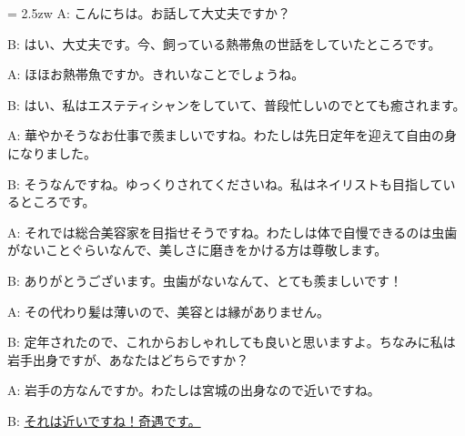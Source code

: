 \documentclass[11pt]{amsart}
\title{}
\author{}
\newenvironment{hangall}[1]{\hangindent = 2.5zw\everypar{\hangindent = 2.5zw}}{}
\begin{document}
\maketitle
\begin{hangall}{}%
A: こんにちは。お話して大丈夫ですか？

B: はい、大丈夫です。今、飼っている熱帯魚の世話をしていたところです。

A: ほほお熱帯魚ですか。きれいなことでしょうね。

B: はい、私はエステティシャンをしていて、普段忙しいのでとても癒されます。

A: 華やかそうなお仕事で羨ましいですね。わたしは先日定年を迎えて自由の身になりました。

B: そうなんですね。ゆっくりされてくださいね。私はネイリストも目指しているところです。

A: それでは総合美容家を目指せそうですね。わたしは体で自慢できるのは虫歯がないことぐらいなんで、美しさに磨きをかける方は尊敬します。

B: ありがとうございます。虫歯がないなんて、とても羨ましいです！

A: その代わり髪は薄いので、美容とは縁がありません。

B: 定年されたので、これからおしゃれしても良いと思いますよ。ちなみに私は岩手出身ですが、あなたはどちらですか？

A: 岩手の方なんですか。わたしは宮城の出身なので近いですね。

B: \ul{それは近いですね！奇遇です。}\end{hangall}
\end{document}
